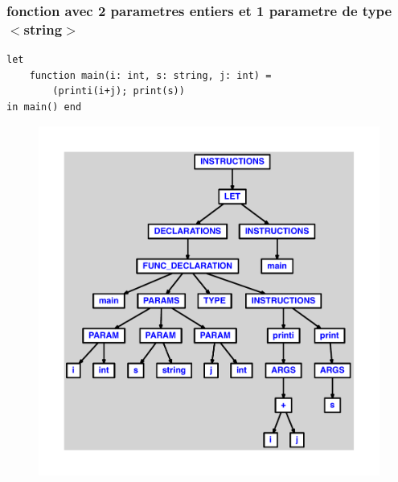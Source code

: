 \documentclass{article}
\begin{document}
\subsubsection{fonction avec 2 parametres entiers et 1 parametre de type $ < $string$ > $}
\begin{lstlisting}
let
	function main(i: int, s: string, j: int) =
		(printi(i+j); print(s))
in main() end
\end{lstlisting}
\newpage
\begin{figure}[H]
\centering
\includegraphics[max width=\textwidth]{ast/ast_236.pdf}
\end{figure}
\newpage
\end{document}

